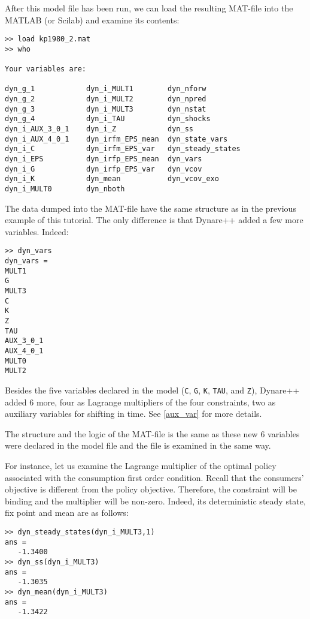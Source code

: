 \documentclass[10pt]{article}
\begin{document}
After this model file has been run, we can load the resulting MAT-file
into the MATLAB (or Scilab) and examine its contents:
{\small
\begin{verbatim}
>> load kp1980_2.mat
>> who

Your variables are:

dyn_g_1            dyn_i_MULT1        dyn_nforw          
dyn_g_2            dyn_i_MULT2        dyn_npred          
dyn_g_3            dyn_i_MULT3        dyn_nstat          
dyn_g_4            dyn_i_TAU          dyn_shocks         
dyn_i_AUX_3_0_1    dyn_i_Z            dyn_ss             
dyn_i_AUX_4_0_1    dyn_irfm_EPS_mean  dyn_state_vars     
dyn_i_C            dyn_irfm_EPS_var   dyn_steady_states  
dyn_i_EPS          dyn_irfp_EPS_mean  dyn_vars           
dyn_i_G            dyn_irfp_EPS_var   dyn_vcov           
dyn_i_K            dyn_mean           dyn_vcov_exo       
dyn_i_MULT0        dyn_nboth          
\end{verbatim}
}

The data dumped into the MAT-file have the same structure as in the
previous example of this tutorial. The only difference is that
Dynare++ added a few more variables. Indeed:
{\small
\begin{verbatim}
>> dyn_vars
dyn_vars =
MULT1    
G        
MULT3    
C        
K        
Z        
TAU      
AUX_3_0_1
AUX_4_0_1
MULT0    
MULT2    
\end{verbatim}
}
Besides the five variables declared in the model ({\tt C}, {\tt G},
{\tt K}, {\tt TAU}, and {\tt Z}), Dy\-na\-re++ added 6 more, four as Lagrange
multipliers of the four constraints, two as auxiliary variables for
shifting in time. See \ref{aux_var} for more details.

The structure and the logic of the MAT-file is the same as these new 6
variables were declared in the model file and the file is examined in
the same way.

For instance, let us examine the Lagrange multiplier of the optimal
policy associated with the consumption first order condition. Recall
that the consumers' objective is different from the policy
objective. Therefore, the constraint will be binding and the
multiplier will be non-zero. Indeed, its deterministic steady state,
fix point and mean are as follows:
{\small
\begin{verbatim}
>> dyn_steady_states(dyn_i_MULT3,1)
ans =
   -1.3400
>> dyn_ss(dyn_i_MULT3)
ans =
   -1.3035
>> dyn_mean(dyn_i_MULT3)
ans =
   -1.3422
\end{verbatim}
}
\end{document}
